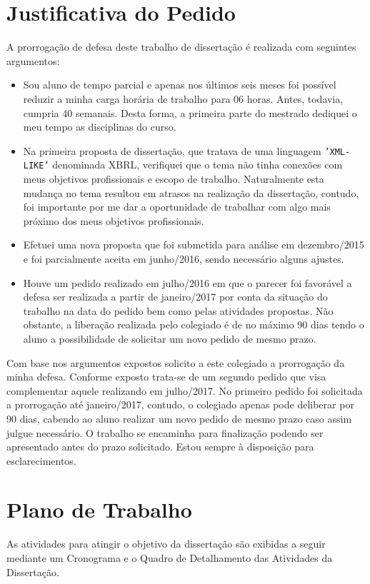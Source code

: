\documentclass[10pt,a4paper]{report}
\begin{document}
\chapter{Justificativa do Pedido}
\label{justificativa}

A prorrogação de defesa deste trabalho de dissertação é realizada com seguintes argumentos:

\begin{itemize}
	\item Sou aluno de tempo parcial e apenas nos últimos seis meses foi
		possível reduzir a minha carga horária de trabalho para 06 horas.
		Antes, todavia, cumpria 40 semanais. Desta forma, a primeira parte do
		mestrado dediquei o meu tempo as disciplinas do curso. 
	\item  Na primeira proposta de dissertação, que tratava de uma linguagem
		\texttt{'XML-LIKE'} denominada XBRL, verifiquei que o tema não tinha
		conexões com meus objetivos profissionais e escopo de trabalho.
		Naturalmente esta mudança no tema resultou em atrasos na realização da
		dissertação, contudo, foi importante por me dar a oportunidade de
		trabalhar com algo mais próximo dos meus objetivos profissionais.
	\item Efetuei uma nova proposta que foi submetida para análise em
		dezembro/2015 e foi parcialmente aceita em junho/2016, sendo necessário
		alguns ajustes.
	\item Houve um pedido realizado em julho/2016 em que o parecer foi favorável
		a defesa ser realizada a partir de janeiro/2017 por conta da situação do
		trabalho na data do pedido bem como pelas atividades propostas. Não
		obstante, a liberação realizada pelo colegiado é de no máximo 90 dias
		tendo o aluno a possibilidade de solicitar um novo pedido de mesmo
		prazo.
\end{itemize}

Com base nos argumentos expostos solicito a este colegiado a prorrogação da
minha defesa. Conforme exposto trata-se de um segundo pedido que visa
complementar aquele realizando em julho/2017. No primeiro pedido foi solicitada
a prorrogação até janeiro/2017, contudo, o colegiado apenas pode deliberar por
90 dias, cabendo ao aluno realizar um novo pedido de mesmo prazo caso assim
julgue necessário. O trabalho se encaminha para finalização podendo ser
apresentado antes do prazo solicitado. Estou sempre à disposição para
esclarecimentos.

\chapter{Plano de Trabalho}
\label{Plano_de_Trabalho}
 As atividades para atingir o objetivo da dissertação são exibidas a seguir mediante um Cronograma e o Quadro de Detalhamento das Atividades da Dissertação. 

 
 
 



\end{document}
